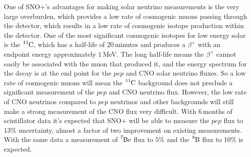 One of SNO+'s advantages for making solar neutrino measurements is the
very large overburden, which provides a low rate of cosmogenic 
muons passing through the detector, which results in a low rate of
cosmogenic isotope production within the detector.
One of the most significant cosmogenic isotopes for low energy solar is
the $\ce{^{11}C}$, which has a half-life of 20\,minutes and produces a
$\beta^{+}$ with an endpoint energy approximately $1$\,MeV.
The long half-life means the $\beta^{+}$ cannot easily be associated with
the muon that produced it, and the energy spectrum for the decay is at
the end point for the $pep$ and CNO solar neutrino fluxes.
So a low rate of cosmogenic muons will mean the $\ce{^{11}C}$ background
does not preclude a significant measurement of the $pep$ and CNO neutrino flux.
However, the low rate of CNO neutrinos compared to $pep$ neutrinos and other
backgrounds will
still make a strong measurement of the CNO flux  very difficult.
With 6\,months of scintillator data it's expected that SNO+ will be able
to measure the $pep$ flux to $13\%$ uncertainty, almost a factor of two
improvement on existing measurements.
With the same data a measurement of $\ce{^{7}Be}$ flux to $5\%$ and the
$\ce{^{8}B}$ flux to $10\%$ is expected.

%
